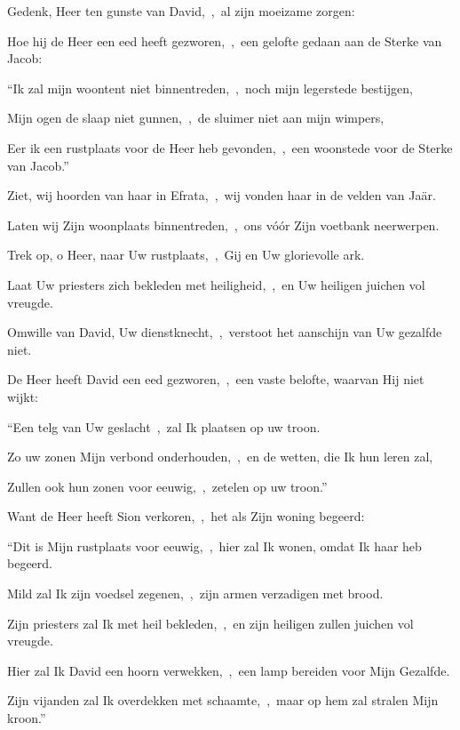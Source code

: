 \documentclass[12pt,twoside,a5paper]{article}
\begin{document}


\begin{halfparskip}
  Gedenk, Heer ten gunste van David,~\sep\ al zijn moeizame zorgen:

  Hoe hij de Heer een eed heeft gezworen,~\sep\ een gelofte gedaan aan de Sterke van Jacob:


  ``Ik zal mijn woontent niet binnentreden,~\sep\ noch mijn legerstede bestijgen,

  Mijn ogen de slaap niet gunnen,~\sep\ de sluimer niet aan mijn wimpers,

  Eer ik een rustplaats voor de Heer heb gevonden,~\sep\ een woonstede voor de Sterke van Jacob.''

  Ziet, wij hoorden van haar in Efrata,~\sep\ wij vonden haar in de velden van Jaär.

  Laten wij Zijn woonplaats binnentreden,~\sep\ ons vóór Zijn voetbank neerwerpen.

  Trek op, o Heer, naar Uw rustplaats,~\sep\ Gij en Uw glorievolle ark.

  Laat Uw priesters zich bekleden met heiligheid,~\sep\ en Uw heiligen juichen vol vreugde.

  Omwille van David, Uw dienstknecht,~\sep\ verstoot het aanschijn van Uw gezalfde niet.

  De Heer heeft David een eed gezworen,~\sep\ een vaste belofte, waarvan Hij niet wijkt:

  ``Een telg van Uw geslacht~\sep\ zal Ik plaatsen op uw troon.

  Zo uw zonen Mijn verbond onderhouden,~\sep\ en de wetten, die Ik hun leren zal,

  Zullen ook hun zonen voor eeuwig,~\sep\ zetelen op uw troon.''

  Want de Heer heeft Sion verkoren,~\sep\ het als Zijn woning begeerd:

  ``Dit is Mijn rustplaats voor eeuwig,~\sep\ hier zal Ik wonen, omdat Ik haar heb begeerd.

  Mild zal Ik zijn voedsel zegenen,~\sep\ zijn armen verzadigen met brood.

  Zijn priesters zal Ik met heil bekleden,~\sep\ en zijn heiligen zullen juichen vol vreugde.

  Hier zal Ik David een hoorn verwekken,~\sep\ een lamp bereiden voor Mijn Gezalfde.

  Zijn vijanden zal Ik overdekken met schaamte,~\sep\ maar op hem zal stralen Mijn kroon.''
\end{halfparskip}
\end{document}
